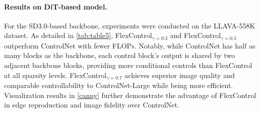 \paragraph{Results on DiT-based model.}
For the SD3.0-based backbone, experiments were conducted on the LLAVA-558K dataset. As detailed in \cref{tab:table5}, FlexControl$_{\gamma=0.3}$ and FlexControl$_{\gamma=0.5}$ outperform ControlNet with fewer FLOPs. Notably, while ControlNet has half as many blocks as the backbone, each control block's output is shared by two adjacent backbone blocks, providing more conditional controls than FlexControl at all sparsity levels. FlexControl$_{\gamma=0.7}$ achieves superior image quality and comparable controllability to ControlNet-Large while being more efficient. Visualization results in \cref{canny} further demonstrate the advantage of FlexControl in edge reproduction and image fidelity over ControlNet.


